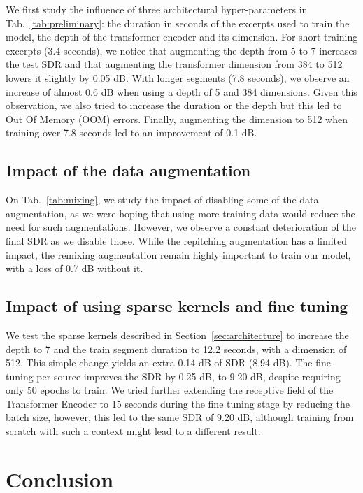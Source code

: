 \documentclass{article}
\begin{document}
We first study the influence of three architectural hyper-parameters in Tab.~\ref{tab:preliminary}: the duration in seconds of the excerpts used to train the model, the depth of the transformer encoder and its dimension.
For short training excerpts (3.4 seconds), we notice that augmenting the depth from 5 to 7 increases the test SDR and that augmenting the transformer dimension from 384 to 512 lowers it slightly by 0.05 dB. With longer segments (7.8 seconds), we observe an increase of almost 0.6 dB when using a depth of 5 and 384 dimensions. Given this observation, we also tried to increase the duration or the depth but this led to Out Of Memory (OOM) errors. Finally, augmenting the dimension to 512 when training over 7.8 seconds led to an improvement of 0.1 dB. 




\subsection{Impact of the data augmentation}
\label{sec:data_augment}

On Tab.~\ref{tab:mixing}, we study the impact of disabling some of the data augmentation, 
as we were hoping that using more training data would reduce the need for such augmentations. However,
we observe a constant deterioration of the final SDR as we disable those.
While the repitching augmentation has a limited impact, the remixing augmentation
remain highly important to train our model, with a loss of 0.7 dB without it.


\subsection{Impact of using sparse kernels and fine tuning}
\label{sec:finetune}

We test the sparse kernels described in Section~\ref{sec:architecture} to increase the depth to 7 and
the train segment duration to 12.2 seconds, with a dimension of 512. This simple change yields an extra 0.14 dB of SDR (8.94 dB). The fine-tuning per source improves the SDR by 0.25 dB, to 9.20 dB, despite requiring only 50 epochs to train. We tried further extending the receptive field
of the Transformer Encoder to 15 seconds during the fine tuning stage by reducing the batch size, 
however, this led to the same SDR of 9.20 dB, although training
from scratch with such a context might lead to a different result.

\section*{Conclusion}
\end{document}
